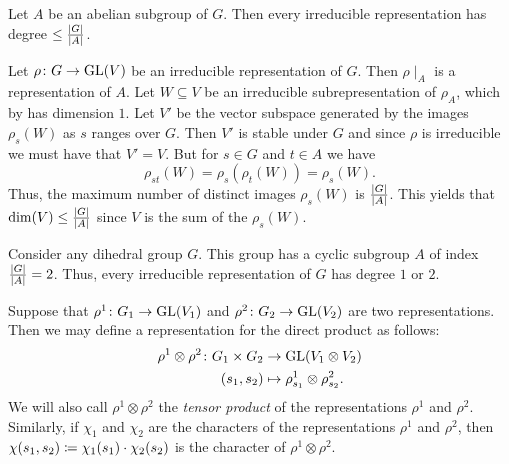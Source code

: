 \documentclass[letterpaper, 11pt, oneside]{book}
\begin{document}
\begin{cor}\label{cor:abelian_deg_1_cor_1}
  Let $A$ be an abelian subgroup of $G$.
  Then every irreducible representation has degree $\leq \frac{\abs{G}}{\abs{A}}$.
\end{cor}
\begin{pf}
  Let $\rho\colon G \to \operatorname{GL}(V)$ be an irreducible representation of $G$.
  Then $\rho\mid_{A}$ is a representation of $A$.
  Let $W \subseteq V$ be an irreducible subrepresentation of $\rho_{A}$, which by  has dimension $1$.
  Let $V'$ be the vector subspace generated by the images $\rho_{s}(W)$ as $s$ ranges over $G$.
  Then $V'$ is stable under $G$ and since $\rho$ is irreducible we must have that $V' = V$.
  But for $s \in G$ and $t \in A$ we have
  \[
    \rho_{st}(W) = \rho_{s}(\rho_{t}(W)) = \rho_{s}(W).
  \]
  Thus, the maximum number of distinct images $\rho_{s}(W)$ is $\frac{\abs{G}}{\abs{A}}$.
  This yields that $\dim(V) \leq \frac{\abs{G}}{\abs{A}}$ since $V$ is the sum of the $\rho_{s}(W)$.
\end{pf}

\begin{ex}
  Consider any dihedral group $G$.
  This group has a cyclic subgroup $A$ of index $\frac{\abs{G}}{\abs{A}} = 2$.
  Thus, every irreducible representation of $G$ has degree $1$ or $2$.
\end{ex}

\begin{defn}\label{defn:direct_product_reps}
  Suppose that $\rho^{1}\colon G_{1} \to \operatorname{GL}(V_{1})$ and $\rho^{2}\colon G_{2} \to \operatorname{GL}(V_{2})$ are two representations.
  Then we may define a representation for the direct product as follows:
  \begin{align*}
    \rho^{1} \otimes \rho^{2}\colon G_{1} \times G_{2} &\to \operatorname{GL}(V_{1} \otimes V_{2}) \\
                                        (s_{1}, s_{2}) &\mapsto \rho^{1}_{s_{1}} \otimes \rho^{2}_{s_{2}}.
  \end{align*}
  We will also call $\rho^{1} \otimes \rho^{2}$ the \emph{tensor product} of the representations $\rho^{1}$ and $\rho^{2}$.
  Similarly, if $\chi_{1}$ and $\chi_{2}$ are the characters of the representations $\rho^{1}$ and $\rho^{2}$, then $\chi(s_{1}, s_{2}) \coloneqq \chi_{1}(s_{1}) \cdot \chi_{2}(s_{2})$ is the character of $\rho^{1} \otimes \rho^{2}$.
\end{defn}
\end{document}
